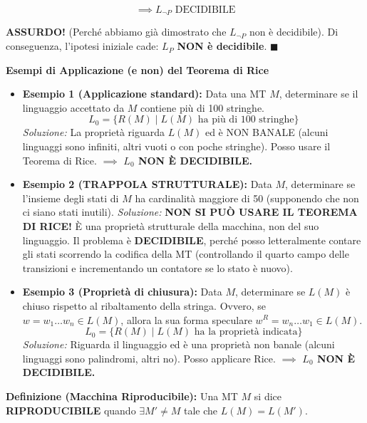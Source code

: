 $$ \implies L_{\neg P} \text{ DECIDIBILE} $$

\textbf{ASSURDO!} (Perché abbiamo già dimostrato che $L_{\neg P}$ non è decidibile). 
Di conseguenza, l'ipotesi iniziale cade: $L_P$ \textbf{NON è decidibile}. $\blacksquare$


\vspace{0.8cm}
\textbf{Esempi di Applicazione (e non) del Teorema di Rice}

\begin{itemize}
    \item \textbf{Esempio 1 (Applicazione standard):} 
    Data una MT $M$, determinare se il linguaggio accettato da $M$ contiene più di 100 stringhe.
    $$ L_0 = \{ R(M) \mid L(M) \text{ ha più di 100 stringhe} \} $$
    \textit{Soluzione:} La proprietà riguarda $L(M)$ ed è NON BANALE (alcuni linguaggi sono infiniti, altri vuoti o con poche stringhe). Posso usare il Teorema di Rice. 
    $\implies$ \textbf{$L_0$ NON È DECIDIBILE.}

    \vspace{0.2cm}
    \item \textbf{Esempio 2 (TRAPPOLA STRUTTURALE):} 
    Data $M$, determinare se l'insieme degli stati di $M$ ha cardinalità maggiore di 50 (supponendo che non ci siano stati inutili).
    \textit{Soluzione:} \textbf{NON SI PUÒ USARE IL TEOREMA DI RICE!} È una proprietà strutturale della macchina, non del suo linguaggio. 
    Il problema è \textbf{DECIDIBILE}, perché posso letteralmente contare gli stati scorrendo la codifica della MT (controllando il quarto campo delle transizioni e incrementando un contatore se lo stato è nuovo).

    \vspace{0.2cm}
    \item \textbf{Esempio 3 (Proprietà di chiusura):} 
    Data $M$, determinare se $L(M)$ è chiuso rispetto al ribaltamento della stringa. Ovvero, se $w = w_1 \dots w_n \in L(M)$, allora la sua forma speculare $w^R = w_n \dots w_1 \in L(M)$.
    $$ L_0 = \{ R(M) \mid L(M) \text{ ha la proprietà indicata} \} $$
    \textit{Soluzione:} Riguarda il linguaggio ed è una proprietà non banale (alcuni linguaggi sono palindromi, altri no). Posso applicare Rice.
    $\implies$ \textbf{$L_0$ NON È DECIDIBILE.}
\end{itemize}

\vspace{0.4cm}
\textbf{Definizione (Macchina Riproducibile):} 
Una MT $M$ si dice \textbf{RIPRODUCIBILE} quando $\exists M' \neq M$ tale che $L(M) = L(M')$.

